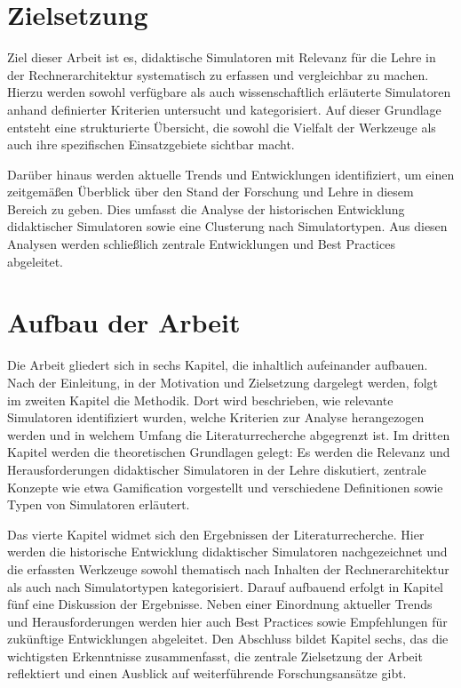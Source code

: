 \section{Zielsetzung}

Ziel dieser Arbeit ist es, didaktische Simulatoren mit Relevanz für die Lehre in der Rechnerarchitektur systematisch zu erfassen und vergleichbar zu machen. Hierzu werden sowohl verfügbare als auch wissenschaftlich erläuterte Simulatoren anhand definierter Kriterien untersucht und kategorisiert. Auf dieser Grundlage entsteht eine strukturierte Übersicht, die sowohl die Vielfalt der Werkzeuge als auch ihre spezifischen Einsatzgebiete sichtbar macht.

Darüber hinaus werden aktuelle Trends und Entwicklungen identifiziert, um einen zeitgemäßen Überblick über den Stand der Forschung und Lehre in diesem Bereich zu geben. Dies umfasst die Analyse der historischen Entwicklung didaktischer Simulatoren sowie eine Clusterung nach Simulatortypen. Aus diesen Analysen werden schließlich zentrale Entwicklungen und Best Practices abgeleitet.

\section{Aufbau der Arbeit}


Die Arbeit gliedert sich in sechs Kapitel, die inhaltlich aufeinander aufbauen. Nach der Einleitung, in der Motivation und Zielsetzung dargelegt werden, folgt im zweiten Kapitel die Methodik. Dort wird beschrieben, wie relevante Simulatoren identifiziert wurden, welche Kriterien zur Analyse herangezogen werden und in welchem Umfang die Literaturrecherche abgegrenzt ist. Im dritten Kapitel werden die theoretischen Grundlagen gelegt: Es werden die Relevanz und Herausforderungen didaktischer Simulatoren in der Lehre diskutiert, zentrale Konzepte wie etwa Gamification vorgestellt und verschiedene Definitionen sowie Typen von Simulatoren erläutert.

Das vierte Kapitel widmet sich den Ergebnissen der Literaturrecherche. Hier werden die historische Entwicklung didaktischer Simulatoren nachgezeichnet und die erfassten Werkzeuge sowohl thematisch nach Inhalten der Rechnerarchitektur als auch nach Simulatortypen kategorisiert. Darauf aufbauend erfolgt in Kapitel fünf eine Diskussion der Ergebnisse. Neben einer Einordnung aktueller Trends und Herausforderungen werden hier auch Best Practices sowie Empfehlungen für zukünftige Entwicklungen abgeleitet. Den Abschluss bildet Kapitel sechs, das die wichtigsten Erkenntnisse zusammenfasst, die zentrale Zielsetzung der Arbeit reflektiert und einen Ausblick auf weiterführende Forschungsansätze gibt.
